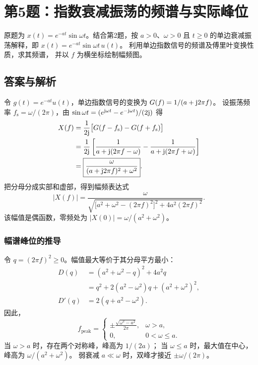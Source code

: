 \section{第5题：指数衰减振荡的频谱与实际峰位}
\label{hw:2-5}

\begin{hwquestion}
原题为 $x(t)=e^{-at}\sin\omega t$。结合第2题，按 $a>0$、$\omega>0$ 且 $t\geq0$ 的单边衰减振荡解释，即
    $x(t)=e^{-at}\sin\omega t\,u(t)$。
    利用单边指数信号的频谱及傅里叶变换性质，求其频谱，
    并以 $f$ 为横坐标绘制幅频图。
\end{hwquestion}

\subsection*{答案与解析}
令 $g(t)=e^{-at}u(t)$，单边指数信号的变换为
$G(f)=1/(a+\mathrm{j}2\pi f)$。
设振荡频率 $f_{\mathrm s}=\omega/(2\pi)$，由
$\sin\omega t=(e^{\mathrm{j}\omega t}-e^{-\mathrm{j}\omega t})/(2\mathrm{j})$ 得
\begin{align*}
    X(f)
    &=\frac{1}{2\mathrm{j}}\bigl[G(f-f_{\mathrm s})-G(f+f_{\mathrm s})\bigr]\\
    &=\frac{1}{2\mathrm{j}}
      \left[
        \frac{1}{a+\mathrm{j}(2\pi f-\omega)}
        -\frac{1}{a+\mathrm{j}(2\pi f+\omega)}
      \right]\\
    &=\boxed{\frac{\omega}{(a+\mathrm{j}2\pi f)^2+\omega^2}}.
\end{align*}
把分母分成实部和虚部，得到幅频表达式
\[
    \boxed{
    |X(f)|=
    \frac{\omega}
    {\sqrt{\bigl[a^2+\omega^2-(2\pi f)^2\bigr]^2
    +4a^2(2\pi f)^2}}
    }.
\]
该幅值是偶函数，零频处为
$|X(0)|=\omega/(a^2+\omega^2)$。

\subsubsection*{幅谱峰位的推导}
令 $q=(2\pi f)^2\geq0$。幅值最大等价于其分母平方最小：
\begin{align*}
    D(q)
    &=(a^2+\omega^2-q)^2+4a^2q\\
    &=q^2+2(a^2-\omega^2)q+(a^2+\omega^2)^2,\\
    D'(q)&=2(q+a^2-\omega^2).
\end{align*}
因此，
\[
    \boxed{
    f_{\mathrm{peak}}=
    \begin{cases}
        \displaystyle\pm\frac{\sqrt{\omega^2-a^2}}{2\pi},
            &\omega>a,\\[2mm]
        0,&0<\omega\leq a.
    \end{cases}}
\]
当 $\omega>a$ 时，存在两个对称峰，峰高为 $1/(2a)$；
当 $\omega\leq a$ 时，最大值在中心，峰高为
$\omega/(a^2+\omega^2)$。
弱衰减 $a\ll\omega$ 时，双峰才接近 $\pm\omega/(2\pi)$。


